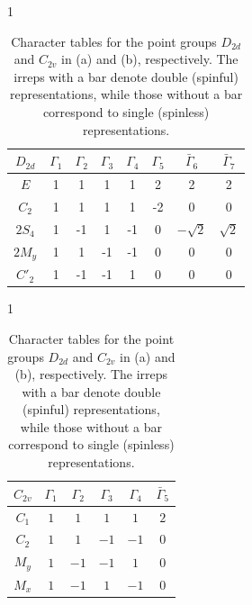 \documentclass[aps, preprint, prb,]{revtex4-2}
\begin{document}
\begin{table}[h]
\centering
\renewcommand{\arraystretch}{1.2}
\begin{subtable}{1\textwidth}
\begin{tabular}{|c|c|c|c|c|c|c|c|}
\hline
$D_{2d}$ & $\Gamma_1$ & $\Gamma_2$ & $\Gamma_3$ & $\Gamma_4$ & $\Gamma_5$ & $\bar{\Gamma}_6$ & $\bar{\Gamma}_7$ \\
\hline
$E$ & 1 & 1 & 1 & 1 & 2 & 2 & 2 \\
$C_2$ & 1 & 1 & 1 & 1 & -2 & 0 & 0 \\
$2S_4$ & 1 & -1 & 1 & -1 & 0 & $-\sqrt{2}$ & $\sqrt{2}$ \\
$2M_y$ & 1 & 1 & -1 & -1 & 0 & 0 & 0 \\
$C'_2$ & 1 & -1 & -1 & 1 & 0 & 0 & 0 \\
\hline
\end{tabular} 
\caption{}
\end{subtable}
\begin{subtable}{1\textwidth}
\begin{tabular}{|c|c|c|c|c|c|}
\hline
$C_{2v}$ & $\Gamma_1$ & $\Gamma_2$ & $\Gamma_3$ & $\Gamma_4$ & $\bar{\Gamma}_5$ \\
\hline
$C_1$ & $1$ & $1$ & $1$ & $1$ & $2$ \\
$C_2$ & $1$ & $1$ & $-1$ & $-1$ & $0$ \\
$M_y$ & $1$ & $-1$ & $-1$ & $1$ & $0$ \\
$M_x$ & $1$ & $-1$ & $1$ & $-1$ & $0$ \\
\hline
\end{tabular}
\caption{}
\end{subtable}
\caption { \justifying Character tables for the point groups $D_{2d}$ and $C_{2v}$ in (a) and (b), respectively. The irreps with a bar denote double (spinful) representations, while those without a bar correspond to single (spinless) representations.}
\label{Tab:charter table D2d c2v}
\end{table}


\end{document}
